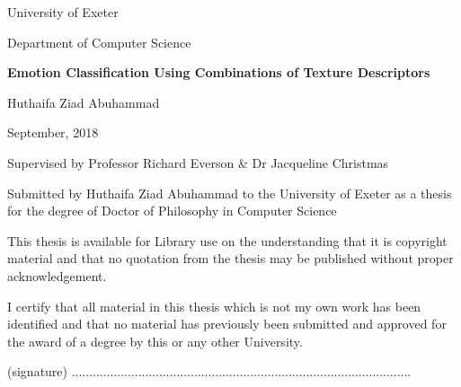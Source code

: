 \begin{titlepage}
    \begin{center}
    
    University of Exeter
    
    Department of Computer Science
        
        \LARGE
        \textbf{Emotion Classification Using Combinations of Texture Descriptors }
        
        \vspace{0.5cm}
\normalsize        
        \vspace{1.5cm}
        
   Huthaifa Ziad Abuhammad
      
       September, 2018
        \end{center} 
                \vfill

      \begin{center}
        Supervised by Professor Richard Everson \& Dr Jacqueline Christmas

          \end{center}
          
        \vfill
        \begin{flushleft}

       
              \end{flushleft}
              
              \vfill
              Submitted by Huthaifa Ziad Abuhammad to the University of Exeter as a thesis for the degree of Doctor of Philosophy in Computer Science
           

              \begin{flushleft}
       This thesis is available for Library use on the understanding that it is copyright material
and that no quotation from the thesis may be published without proper acknowledgement.
    \end{flushleft}
   \vfill
 \begin{flushleft}
I certify that all material in this thesis which is not my own work has been identified
and that no material has previously been submitted and approved for the award of a
degree by this or any other University.

              \end{flushleft}
          \vfill
          \vfill
       \begin{center}
       (signature) .................................................................................................
         \end{center}
        
        
     
  
\end{titlepage}